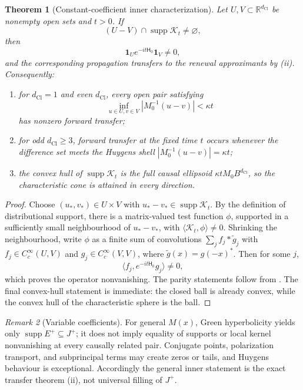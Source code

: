 \documentclass[11pt]{article}
\newtheorem{theorem}{Theorem}[section]
\theoremstyle{definition}
\theoremstyle{remark}
\newtheorem{remark}[theorem]{Remark}
\newcommand{\R}{\mathbb{R}}
\newcommand{\dCl}{d_{\mathrm{Cl}}}
\newcommand{\supp}{\operatorname{supp}}
\newcommand{\one}{\mathbf{1}}
\newcommand{\Ham}{\mathsf{H}}
\begin{document}
\begin{theorem}[Constant-coefficient inner characterization]
\label{thm:constant-inner-characterization}
Let \(U,V\subset\R^{\dCl}\) be nonempty open sets and \(t>0\).
If
\[
 (U-V)\cap\supp\mathcal K_t\ne\varnothing,
\]
then
\[
 \one_Ue^{-it\Ham_0}\one_V\ne0,
\]
and the corresponding propagation transfers to the renewal approximants by
(ii).  Consequently:
\begin{enumerate}[label=\textup{(\roman*)},leftmargin=2.4em]
\item for \(\dCl=1\) and even \(\dCl\), every open pair satisfying
\[
 \inf_{u\in U,v\in V}|M_0^{-1}(u-v)|<\kappa t
\]
has nonzero forward transfer;
\item for odd \(\dCl\ge3\), forward transfer at the fixed time \(t\) occurs
whenever the difference set meets the Huygens shell
\(|M_0^{-1}(u-v)|=\kappa t\);
\item the convex hull of \(\supp\mathcal K_t\) is the full causal ellipsoid
\(\kappa tM_0B^{\dCl}\), so the characteristic cone is attained in every
direction.
\end{enumerate}
\end{theorem}

\begin{proof}
Choose \((u_*,v_*)\in U\times V\) with
\(u_*-v_*\in\supp\mathcal K_t\).  By the definition of distributional support,
there is a matrix-valued test function \(\phi\), supported in a sufficiently
small neighbourhood of \(u_*-v_*\), with
\(\langle\mathcal K_t,\phi\rangle\ne0\).  Shrinking the neighbourhood, write
\(\phi\) as a finite sum of convolutions
\(\sum_j f_j*\widetilde g_j\) with \(f_j\in C_c^\infty(U,V)\) and
\(g_j\in C_c^\infty(V,V)\), where
\(\widetilde g(x)=g(-x)^*\).  Then for some \(j\),
\[
 \langle f_j,e^{-it\Ham_0}g_j\rangle\ne0,
\]
which proves the operator nonvanishing.  The parity statements follow from
.  The final convex-hull statement is immediate:
the closed ball is already convex, while the convex hull of the characteristic
sphere is the ball.
\end{proof}

\begin{remark}[Variable coefficients]
\label{rem:variable-inner-status}
For general \(M(x)\), Green hyperbolicity yields only
\(\supp E^+\subseteq J^+\); it does not imply equality of supports or local
kernel nonvanishing at every causally related pair.  Conjugate points,
polarization transport, and subprincipal terms may create zeros or tails, and
Huygens behaviour is exceptional.  Accordingly the general inner statement is
the exact transfer theorem (ii), not universal
filling of \(J^+\).
\end{remark}
\end{document}
